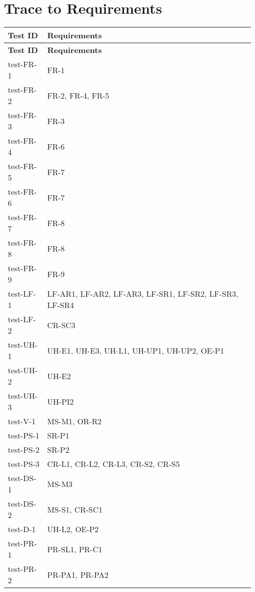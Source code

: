 \documentclass[12pt, titlepage]{article}
\begin{document}
\section{Trace to Requirements}

\begin{center}
    \begin{longtable}{|>{\centering\arraybackslash}p{4cm}|>{\centering\arraybackslash}p{10cm}|}
    \hline
    \textbf{Test ID} & \textbf{Requirements} \\
    \hline
    \endfirsthead
    
    \hline
    \textbf{Test ID} & \textbf{Requirements} \\
    \hline
    \endhead
    
    test-FR-1 & FR-1 \\
    \hline
    test-FR-2 & FR-2, FR-4, FR-5 \\
    \hline
    test-FR-3 & FR-3 \\
    \hline
    test-FR-4 & FR-6 \\
    \hline
    test-FR-5 & FR-7 \\
    \hline
    test-FR-6 & FR-7 \\
    \hline
    test-FR-7 & FR-8 \\
    \hline
    test-FR-8 & FR-8 \\
    \hline
    test-FR-9 & FR-9 \\
    \hline
    test-LF-1 & LF-AR1, LF-AR2, LF-AR3, LF-SR1, LF-SR2, LF-SR3, LF-SR4 \\
    \hline
    test-LF-2 & CR-SC3 \\
    \hline
    test-UH-1 & UH-E1, UH-E3, UH-L1, UH-UP1, UH-UP2, OE-P1 \\
    \hline
    test-UH-2 & UH-E2 \\
    \hline
    test-UH-3 & UH-PI2 \\
    \hline
    test-V-1 & MS-M1, OR-R2 \\
    \hline
    test-PS-1 & SR-P1 \\
    \hline
    test-PS-2 & SR-P2 \\
    \hline
    test-PS-3 & CR-L1, CR-L2, CR-L3, CR-S2, CR-S5 \\
    \hline
    test-DS-1 & MS-M3 \\
    \hline
    test-DS-2 & MS-S1, CR-SC1 \\
    \hline
    test-D-1 & UH-L2, OE-P2 \\
    \hline
    test-PR-1 & PR-SL1, PR-C1 \\
    \hline
    test-PR-2 & PR-PA1, PR-PA2 \\

\end{longtable}
\end{center}
\end{document}
